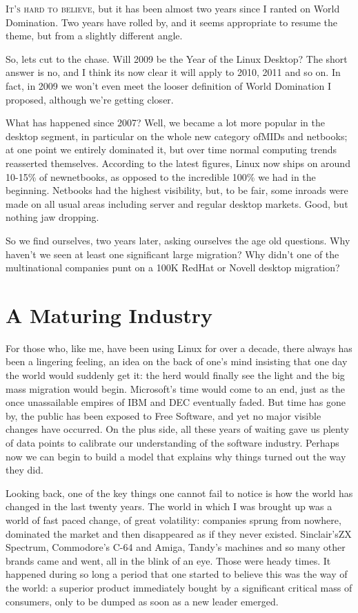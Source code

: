 \documentclass{book}
\begin{document}
\lettrine{I}{t's hard to believe}, but it has been almost two years
since I ranted on World Domination. Two years have rolled by, and it
seems appropriate to resume the theme, but from a slightly different
angle.

So, lets cut to the chase. Will 2009 be the Year of the Linux Desktop?
The short answer is no, and I think its now clear it will apply to
2010, 2011 and so on. In fact, in 2009 we won't even meet the looser
definition of World Domination I proposed, although we're getting
closer.

What has happened since 2007? Well, we became a lot more popular in
the desktop segment, in particular on the whole new category ofMIDs
and netbooks; at one point we entirely dominated it, but over time
normal computing trends reasserted themselves. According to the latest
figures, Linux now ships on around 10-15\% of newnetbooks, as opposed
to the incredible 100\% we had in the beginning. Netbooks had the
highest visibility, but, to be fair, some inroads were made on all
usual areas including server and regular desktop markets. Good, but
nothing jaw dropping.

So we find ourselves, two years later, asking ourselves the age old
questions. Why haven't we seen at least one significant large
migration? Why didn't one of the multinational companies punt on a
100K RedHat or Novell desktop migration?

\section{A Maturing Industry}

For those who, like me, have been using Linux for over a decade, there
always has been a lingering feeling, an idea on the back of one's mind
insisting that one day the world would suddenly get it: the herd would
finally see the light and the big mass migration would
begin. Microsoft's time would come to an end, just as the once
unassailable empires of IBM and DEC eventually faded. But time has
gone by, the public has been exposed to Free Software, and yet no
major visible changes have occurred. On the plus side, all these years
of waiting gave us plenty of data points to calibrate our
understanding of the software industry. Perhaps now we can begin to
build a model that explains why things turned out the way they did.

Looking back, one of the key things one cannot fail to notice is how
the world has changed in the last twenty years. The world in which I
was brought up was a world of fast paced change, of great volatility:
companies sprung from nowhere, dominated the market and then
disappeared as if they never existed. Sinclair'sZX Spectrum,
Commodore's C-64 and Amiga, Tandy's machines and so many other brands
came and went, all in the blink of an eye. Those were heady times. It
happened during so long a period that one started to believe this was
the way of the world: a superior product immediately bought by a
significant critical mass of consumers, only to be dumped as soon as a
new leader emerged.
\end{document}
